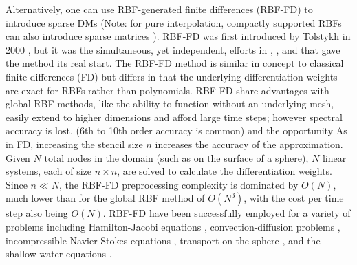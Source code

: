 Alternatively, one can use RBF-generated finite differences (RBF-FD) to introduce sparse DMs (Note: for pure interpolation, compactly supported RBFs can also introduce sparse matrices \cite{Wendland1995}).
RBF-FD was first introduced by Tolstykh in 2000 \cite{Tolstykh2000}, 
but it was the simultaneous, yet independent,
efforts in \cite{Shu2003}, \cite{Tolstykh2003a}, \cite{Wright2003} and \cite{Cecil2004} that gave the method its real start. 
The RBF-FD method is similar in concept to classical 
finite-differences (FD) but differs in that the underlying differentiation 
weights are exact for RBFs rather than polynomials. RBF-FD 
share advantages with global RBF methods, 
like the ability to function without an underlying mesh, easily extend to higher dimensions and afford large time steps; however spectral accuracy is lost. 
(6th to 10th order accuracy is common) and the opportunity 
As in FD, increasing the stencil size $n$  increases the accuracy of the approximation.
Given $N$ total nodes in the domain (such as on the surface of a sphere), $N$ linear systems, each of size $n \times n$, are solved to calculate the differentiation weights. Since $n \ll N$, the RBF-FD preprocessing complexity is dominated by $O(N)$, much lower than for the global RBF method of $O(N^3)$, with the cost per time step also being $O(N)$. RBF-FD have been successfully employed for a variety of problems including Hamilton-Jacobi equations \cite{Cecil2004}, convection-diffusion problems \cite{Chandhini2007, Stevens2009b},
incompressible Navier-Stokes equations \cite{Shu2003,Chinchapatnam2009}, transport on the sphere \cite{FornbergLehto11}, and the shallow water equations \cite{FlyerLehto11}.

